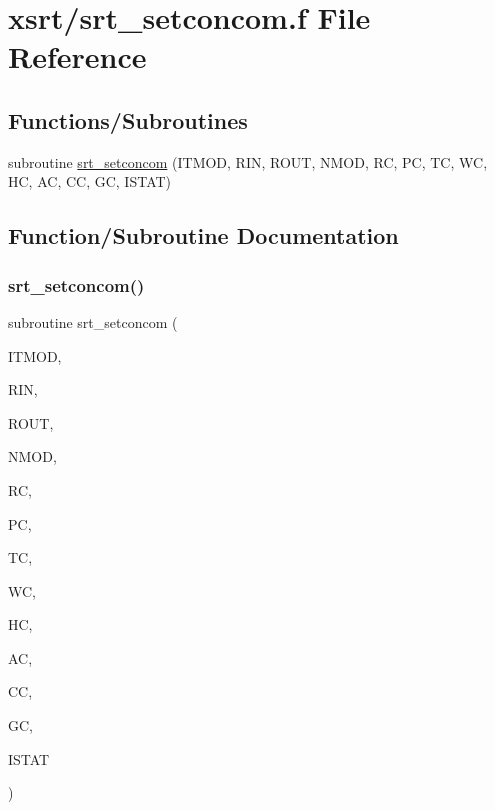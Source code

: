 \hypertarget{srt__setconcom_8f}{}\section{xsrt/srt\+\_\+setconcom.f File Reference}
\label{srt__setconcom_8f}
\subsection*{Functions/\+Subroutines}
\begin{DoxyCompactItemize}
\item 
subroutine \hyperlink{srt__setconcom_8f_a41552c8b1093b4a12b9fcb8ec2bd2d3a}{srt\+\_\+setconcom} (I\+T\+M\+OD, R\+IN, R\+O\+UT, N\+M\+OD, RC, PC, TC, WC, HC, AC, CC, GC, I\+S\+T\+AT)
\end{DoxyCompactItemize}


\subsection{Function/\+Subroutine Documentation}
\mbox{\label{srt__setconcom_8f_a41552c8b1093b4a12b9fcb8ec2bd2d3a}} 
\subsubsection{\texorpdfstring{srt\+\_\+setconcom()}{srt\_setconcom()}}
{\footnotesize\ttfamily subroutine srt\+\_\+setconcom (\begin{DoxyParamCaption}\item[{integer}]{I\+T\+M\+OD,  }\item[{double precision}]{R\+IN,  }\item[{double precision}]{R\+O\+UT,  }\item[{integer}]{N\+M\+OD,  }\item[{double precision, dimension(nmod)}]{RC,  }\item[{double precision, dimension(nmod)}]{PC,  }\item[{double precision, dimension(nmod)}]{TC,  }\item[{double precision, dimension(nmod)}]{WC,  }\item[{double precision, dimension(nmod)}]{HC,  }\item[{double precision, dimension(nmod)}]{AC,  }\item[{double precision, dimension(nmod)}]{CC,  }\item[{double precision, dimension(nmod)}]{GC,  }\item[{integer}]{I\+S\+T\+AT }\end{DoxyParamCaption})}

